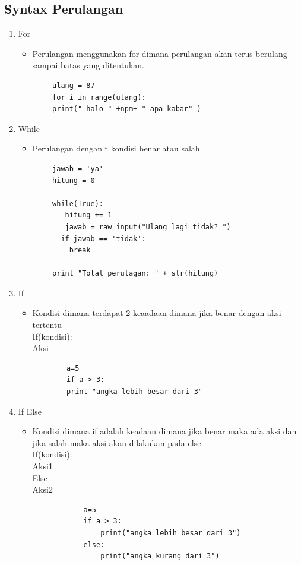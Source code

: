 \documentclass[a4paper,12pt]{report}
\begin{document}
\subsection{Syntax Perulangan}
\begin{enumerate}
    \item For
    \begin{itemize}
        \item Perulangan menggunakan for dimana perulangan akan terus berulang sampai batas yang ditentukan.
    \end{itemize}
    \begin{verbatim}
        ulang = 87
        for i in range(ulang):
        print(" halo " +npm+ " apa kabar" )
    \end{verbatim}
    \item While
    \begin{itemize}
        \item Perulangan dengan t kondisi benar atau salah. 
    \end{itemize}
    \begin{verbatim}
        jawab = 'ya'
        hitung = 0

        while(True):
           hitung += 1
           jawab = raw_input("Ulang lagi tidak? ")
          if jawab == 'tidak':
            break

        print "Total perulagan: " + str(hitung)
    \end{verbatim}
    \item If
    \begin{itemize}
        \item Kondisi dimana terdapat 2 keaadaan dimana jika benar dengan aksi tertentu\\
        If(kondisi):\\
        Aksi\\
        \begin{verbatim}
        a=5
        if a > 3:
        print "angka lebih besar dari 3"
        \end{verbatim}
    \end{itemize}
    \item If Else
    \begin{itemize}
        \item Kondisi dimana if adalah keadaan dimana jika benar maka ada aksi dan jika salah maka aksi akan dilakukan pada else\\
            If(kondisi):\\
            Aksi1\\
            Else\\
            Aksi2\\
        \begin{verbatim}
            a=5
            if a > 3:
                print("angka lebih besar dari 3")
            else:
                print("angka kurang dari 3")
        \end{verbatim}
    \end{itemize}
\end{enumerate}
\end{document}
